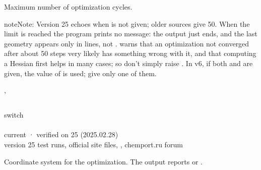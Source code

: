 \documentclass[letterpaper,10pt,english,openany,oneside]{sphinxmanual}
\begin{document}
\sphinxAtStartPar
Maximum number of optimization cycles.

\begin{sphinxadmonition}{note}{Note:}
\sphinxAtStartPar
Version 25 echoes  when  is not given; older sources give 50. When the
limit is reached the program prints no message: the output just ends, and the last geometry appears only in
 lines, not .  warns that an optimization not converged after about 50 steps very likely
has something wrong with it, and that computing a Hessian first helps in many cases; so don’t simply raise
. In v6, if both  and  are
given, the value of  is used; give only one of them.
\end{sphinxadmonition}

\sphinxAtStartPar
{} {\hyperref[\detokenize{reference/optimize:optimize-tolerance}]{}}, {\hyperref[\detokenize{reference/d2edr2:d2edr2-steps}]{}}


\subsection{}
\label{\detokenize{reference/optimize:cartesian}}\label{\detokenize{reference/optimize:optimize-cartesian}}
\ignorespaces 
\sphinxAtStartPar
{} switch\\
 \\
 current · verified on 25 (2025.02.28)\\
 version 25 test runs, official site files, , chemport.ru forum

\sphinxAtStartPar
Coordinate system for the optimization. The output reports  or .
\end{document}
